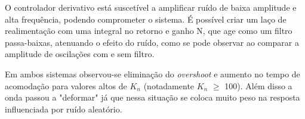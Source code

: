 O controlador derivativo está suscetível a amplificar ruído de baixa amplitude e alta frequência, podendo comprometer o sistema. É possível criar um laço de realimentação com uma integral no retorno e ganho N, que age como um filtro passa-baixas, atenuando o efeito do ruído, como se pode observar ao comparar a amplitude de oscilações com e sem filtro.

Em ambos sistemas observou-se eliminação do \emph{overshoot} e aumento no tempo de acomodação para valores altos de $K_n$ (notadamente $K_n$ $\geq$ 100). Além disso a onda passou a "deformar" já que nessa situação se coloca muito peso na resposta influenciada por ruído aleatório.

